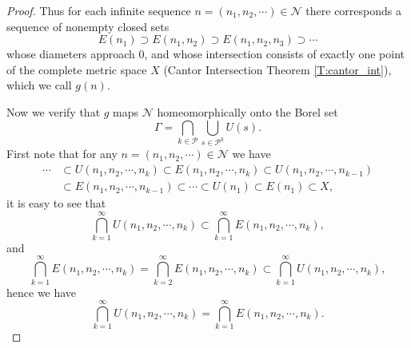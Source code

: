 \begin{proof}
Thus for each infinite sequence $n=(n_1,n_2,\cdots)\in\mathcal{N}$ there
corresponds a sequence of nonempty closed sets
\[
  E(n_1)\supset E(n_1,n_2) \supset E(n_1,n_2,n_3) \supset \cdots
\]
whose diameters approach $0$, and whose intersection consists of exactly one
point of the complete metric space $X$ (Cantor Intersection Theorem 
\ref{T:cantor_int}), which we call $g(n)$.

Now we verify that $g$ maps $\mathcal{N}$ homeomorphically onto the Borel set
\[
	\Gamma = \bigcap_{k\in\mathcal{P}} \bigcup_{s\in\mathcal{P}^k} U(s).
\]
First note that for any $n=(n_1,n_2,\cdots)\in\mathcal{N}$ we have
\begin{align*}
	\cdots 
	&\subset U(n_1,n_2,\cdots,n_k) \subset E(n_1,n_2,\cdots,n_k)
  	\subset U(n_1,n_2,\cdots,n_{k-1})  \\
	&\subset E(n_1,n_2,\cdots,n_{k-1})
  	\subset \cdots \subset U(n_1) \subset E(n_1) \subset X,
\end{align*}
it is easy to see that 
\[
	\bigcap_{k=1}^{\infty} U(n_1,n_2,\cdots,n_k) 
	  \subset \bigcap_{k=1}^{\infty} E(n_1,n_2,\cdots,n_k),
\]
and
\[
	\bigcap_{k=1}^{\infty} E(n_1,n_2,\cdots,n_k)
	= \bigcap_{k=2}^{\infty} E(n_1,n_2,\cdots,n_k)
	\subset \bigcap_{k=1}^{\infty} U(n_1,n_2,\cdots,n_k),
\]
hence we have
\[
	\bigcap_{k=1}^{\infty} U(n_1,n_2,\cdots,n_k) 
	= \bigcap_{k=1}^{\infty} E(n_1,n_2,\cdots,n_k).
\]



\end{proof}
